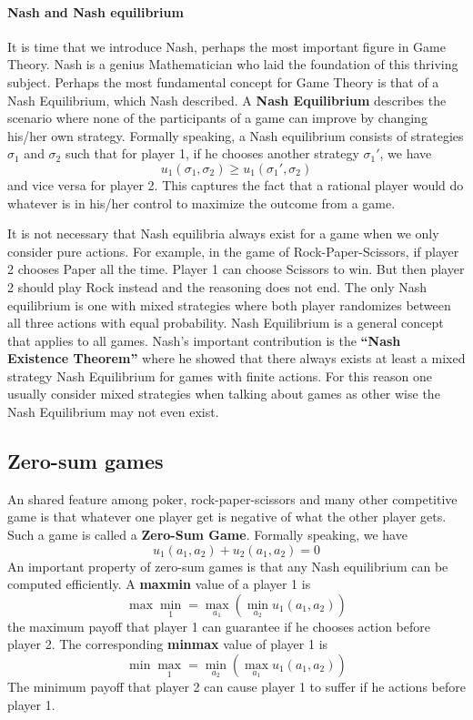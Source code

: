 \documentclass[10pt,a4paper]{article}
\begin{document}
\paragraph{Nash and Nash equilibrium}
It is time that we introduce Nash, perhaps the most important figure in Game Theory. Nash is a genius Mathematician who laid the foundation of this thriving subject. Perhaps the most fundamental concept for Game Theory is that of a Nash Equilibrium, which Nash described. A \textbf{Nash Equilibrium} describes the scenario where none of the participants of a game can improve by changing his/her own strategy. Formally speaking, a Nash equilibrium consists of strategies $\sigma_1$ and $\sigma_2$ such that for player 1, if he chooses another strategy $\sigma_1'$, we have
$$
	u_1(\sigma_1, \sigma_2) \geq u_1(\sigma_1', \sigma_2)
$$
and vice versa for player 2. This captures the fact that a rational player would do whatever is in his/her control to maximize the outcome from a game.

It is not necessary that Nash equilibria always exist for a game when we only consider pure actions. For example, in the game of Rock-Paper-Scissors, if player 2 chooses Paper all the time. Player 1 can choose Scissors to win. But then player 2 should play Rock instead and the reasoning does not end. The only Nash equilibrium is one with mixed strategies where both player randomizes between all three actions with equal probability. Nash Equilibrium is a general concept that applies to all games. Nash's important contribution is the \textbf{``Nash Existence Theorem''} where he showed that there always exists at least a mixed strategy Nash Equilibrium for games with finite actions. For this reason one usually consider mixed strategies when talking about games as other wise the Nash Equilibrium may not even exist.

\subsection{Zero-sum games}
An shared feature among poker, rock-paper-scissors and many other competitive game is that whatever one player get is negative of what the other player gets. Such a game is called a \textbf{Zero-Sum Game}. Formally speaking, we have
$$
	u_1(a_1, a_2) + u_2(a_1, a_2) = 0
$$
An important property of zero-sum games is that any Nash equilibrium can be computed efficiently. A \textbf{maxmin} value of a player 1 is
$$
	\max\min_1 = \max_{a_1}(\min_{a_{2}} u_1(a_1, a_{2}))
$$
the maximum payoff that player 1 can guarantee if he chooses action before player 2. The corresponding \textbf{minmax} value of player 1 is
$$
	\min\max_1 = \min_{a_2}(\max_{a_{1}} u_1(a_1, a_{2}))
$$
The minimum payoff that player 2 can cause player 1 to suffer if he actions before player 1.
\end{document}
